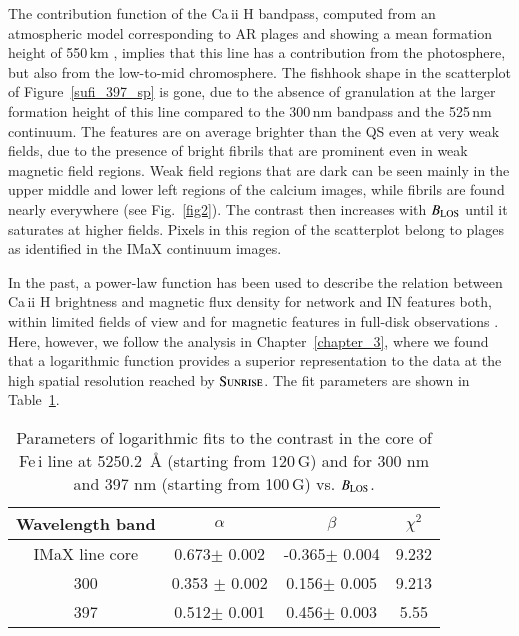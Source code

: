 \documentclass[goettingen, gauss, print]{thesis}
\begin{document}
The contribution function of the Ca\,{\sc ii} H bandpass, computed from an atmospheric model corresponding to AR plages and showing a mean formation height of 550\,km \citep{jafarzadeh_slender_2017}, implies that this line has a contribution from the photosphere, but also from the low-to-mid chromosphere.
The fishhook shape in the scatterplot of Figure~\ref{sufi_397_sp} is gone, due to the absence of granulation at the larger formation height of this line compared to the 300\,nm bandpass and the 525\,nm continuum. The features are on average brighter than the QS even at very weak fields, due to the presence of bright fibrils that are prominent even in weak magnetic field regions. Weak field regions that are dark can be seen mainly in the upper middle and lower left regions of the calcium images, while fibrils are found nearly everywhere (see Fig.~\ref{fig2}). The contrast then increases with $B_{\rm LOS}$ until it saturates at higher fields. Pixels in this region of the scatterplot belong to plages as identified in the IMaX continuum images. 

In the past, a power-law function has been used to describe the relation between Ca\,{\sc ii} H brightness and magnetic flux density for network and IN features both, within limited fields of view \cite[]
{rezaei_relation_2007,loukitcheva_relationship_2009}  
and for magnetic features in full-disk observations \citep[]{ortiz_how_2005, chatzistergos_analysis_2017}. Here, however, we follow the analysis in Chapter~\ref{chapter_3}, where we found that a logarithmic function provides a superior representation to the data at the high spatial resolution reached by $\textsc{Sunrise}$. The fit parameters are shown in Table~\ref{tab1}.





\begin{table}
\caption{Parameters of logarithmic fits to the contrast in the core of Fe\,{\sc i} line at 5250.2\, \AA{} (starting from 120\,G) and for 300 nm and 397 nm (starting from 100\,G) vs. $B_{\rm LOS}$. }
\label{tab1}
\centering
\begin{tabular}{c c c c}
\hline \hline

Wavelength band & $\alpha$ & $\beta$ & $\chi^2$ \\
\hline
IMaX line core & 0.673$\pm$ 0.002 & -0.365$\pm$ 0.004 & 9.232 \\
\hline
300 & 0.353 $\pm$ 0.002&0.156$\pm$ 0.005&9.213\\
\hline
397 & 0.512$\pm$ 0.001&0.456$\pm$ 0.003&5.55\\
\hline
\hline
\end{tabular}

\end{table}
\end{document}
